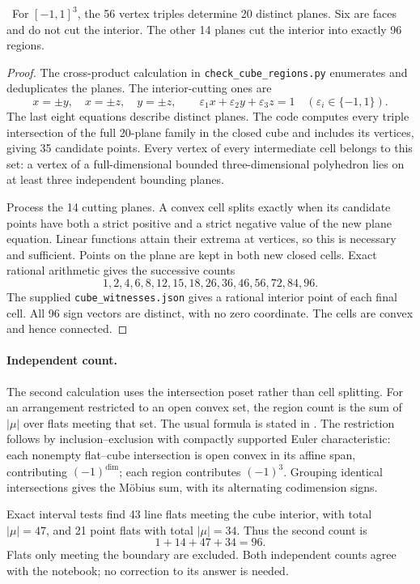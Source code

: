 \begin{proposition}\oursComputed\ 
For \([-1,1]^3\), the 56 vertex triples determine 20 distinct planes.
Six are faces and do not cut the interior. The other 14 planes cut
the interior into exactly 96 regions.
\end{proposition}
\begin{proof}
The cross-product calculation in
\texttt{check\_\allowbreak{}cube\_\allowbreak{}regions.py} enumerates and deduplicates the planes.
The interior-cutting ones are
\[
 x=\pm y,\quad x=\pm z,\quad y=\pm z,\qquad
 \varepsilon_1x+\varepsilon_2y+\varepsilon_3z=1
     \quad(\varepsilon_i\in\{-1,1\}).
\]
The last eight equations describe distinct planes.
The code computes every triple intersection of the full 20-plane
family in the closed cube and includes its vertices, giving
35 candidate points. Every vertex of every intermediate cell
belongs to this set: a vertex of a full-dimensional bounded
three-dimensional polyhedron lies on at least three independent
bounding planes.

Process the 14 cutting planes. A convex cell splits exactly when
its candidate points have both a strict positive and a strict
negative value of the new plane equation. Linear functions attain
their extrema at vertices, so this is necessary and sufficient.
Points on the plane are kept in both new closed cells.
Exact rational arithmetic gives the successive counts
\[
 1,2,4,6,8,12,15,18,26,36,46,56,72,84,96.
\]
The supplied \texttt{cube\_\allowbreak{}witnesses.json} gives a rational interior
point of each final cell. All 96 sign vectors are distinct, with
no zero coordinate. The cells are convex and hence connected.
\end{proof}

\paragraph{Independent count.}
The second calculation uses the intersection poset rather than
cell splitting. For an arrangement restricted to an open convex
set, the region count is the sum of \(|\mu|\) over flats meeting
that set. The usual formula is stated in
\citet[Theorem~A, p.~100]{greenezaslavsky1983whitney}.
The restriction follows by inclusion--exclusion with compactly
supported Euler characteristic: each nonempty flat--cube
intersection is open convex in its affine span, contributing
\((-1)^{\dim}\); each region contributes \((-1)^3\).
Grouping identical intersections gives the Möbius sum, with its
alternating codimension signs.

Exact interval tests find 43 line flats meeting the cube interior,
with total \(|\mu|=47\), and 21 point flats with total \(|\mu|=34\).
Thus the second count is
\[
                    1+14+47+34=96.
\]
Flats only meeting the boundary are excluded. Both independent
counts agree with the notebook; no correction to its answer is
needed.



